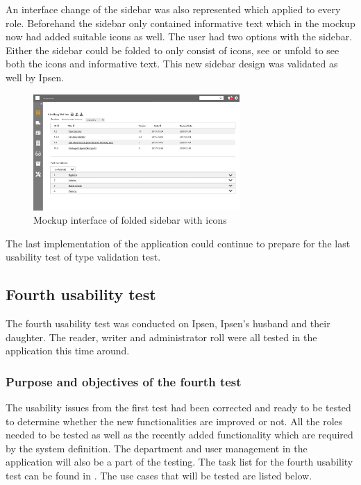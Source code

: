 An interface change of the sidebar was also represented which applied to every role.
Beforehand the sidebar only contained informative text which in the mockup now had added suitable icons as well.
The user had two options with the sidebar.
Either the sidebar could be folded to only consist of icons, see  or unfold to see both the icons and informative text.
This new sidebar design was validated as well by Ipsen.

\begin{figure}[H]
	\centering
		\includegraphics[width=0.7\textwidth]{billeder/ForsideFoldedSidebar.jpg}
	\caption{Mockup interface of folded sidebar with icons}\label{fig:mockupSidebarIcon}
\end{figure}

The last implementation of the application could continue to prepare for the last usability test of type validation test.

\subsection{Fourth usability test}\label{fourthtest}
The fourth usability test was conducted on Ipsen, Ipsen's husband and their daughter.
The reader, writer and administrator roll were all tested in the application this time around.

\subsubsection*{Purpose and objectives of the fourth test}
The usability issues from the first test had been corrected and ready to be tested to determine whether the new functionalities are improved or not.
All the roles needed to be tested as well as the recently added functionality which are required by the system definition.
The department and user management in the application will also be a part of the testing. The task list for the fourth usability test can be found in .
The use cases that will be tested are listed below.

